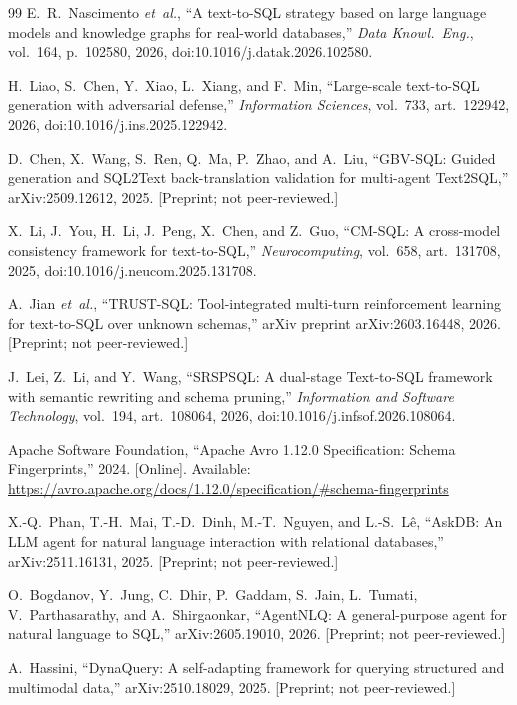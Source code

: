 \documentclass[conference,10pt,a4paper]{IEEEtran}
\begin{document}
\begin{thebibliography}{99}
E.~R.~Nascimento \textit{et~al.}, ``A text-to-SQL strategy based on large
language models and knowledge graphs for real-world databases,''
\emph{Data Knowl.\ Eng.}, vol.~164, p.~102580, 2026,
doi:10.1016/j.datak.2026.102580.

H.~Liao, S.~Chen, Y.~Xiao, L.~Xiang, and F.~Min, ``Large-scale
text-to-SQL generation with adversarial defense,'' \emph{Information
Sciences}, vol.~733, art.~122942, 2026, doi:10.1016/j.ins.2025.122942.

D.~Chen, X.~Wang, S.~Ren, Q.~Ma, P.~Zhao, and A.~Liu, ``GBV-SQL: Guided
generation and SQL2Text back-translation validation for multi-agent
Text2SQL,'' arXiv:2509.12612, 2025. [Preprint; not peer-reviewed.]

X.~Li, J.~You, H.~Li, J.~Peng, X.~Chen, and Z.~Guo, ``CM-SQL: A
cross-model consistency framework for text-to-SQL,'' \emph{Neurocomputing},
vol.~658, art.~131708, 2025, doi:10.1016/j.neucom.2025.131708.

A.~Jian \textit{et~al.}, ``TRUST-SQL: Tool-integrated multi-turn
reinforcement learning for text-to-SQL over unknown schemas,''
arXiv preprint arXiv:2603.16448, 2026. [Preprint; not peer-reviewed.]

J.~Lei, Z.~Li, and Y.~Wang, ``SRSPSQL: A dual-stage Text-to-SQL framework
with semantic rewriting and schema pruning,'' \emph{Information and Software
Technology}, vol.~194, art.~108064, 2026, doi:10.1016/j.infsof.2026.108064.

Apache Software Foundation, ``Apache Avro 1.12.0 Specification: Schema
Fingerprints,'' 2024. [Online]. Available:
\url{https://avro.apache.org/docs/1.12.0/specification/#schema-fingerprints}

X.-Q.~Phan, T.-H.~Mai, T.-D.~Dinh, M.-T.~Nguyen, and L.-S.~L\^e, ``AskDB:
An LLM agent for natural language interaction with relational databases,''
arXiv:2511.16131, 2025. [Preprint; not peer-reviewed.]

O.~Bogdanov, Y.~Jung, C.~Dhir, P.~Gaddam, S.~Jain, L.~Tumati,
V.~Parthasarathy, and A.~Shirgaonkar, ``AgentNLQ: A general-purpose agent
for natural language to SQL,'' arXiv:2605.19010, 2026. [Preprint; not
peer-reviewed.]

A.~Hassini, ``DynaQuery: A self-adapting framework for querying structured
and multimodal data,'' arXiv:2510.18029, 2025. [Preprint; not
peer-reviewed.]

\end{thebibliography}
\end{document}
